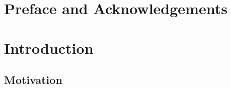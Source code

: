 %
%
%
\section{Preface and Acknowledgements}

\section{Introduction}
\label{sec:introduction}

\subsection{Motivation}
\label{sec:motivation}


